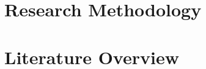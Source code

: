 \documentclass[conference]{IEEEtran}
\begin{document}
\section{Research Methodology}


\section{Literature Overview}










\end{document}
